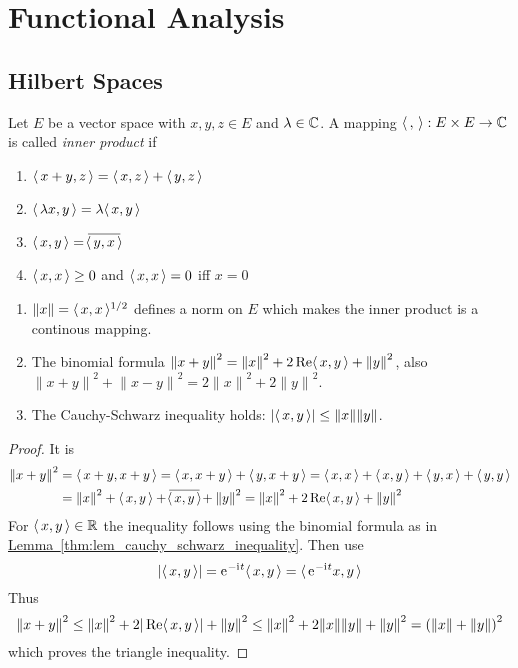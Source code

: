 \newpage
\section{Functional Analysis}

\subsection{Hilbert Spaces}
\bigskip

\begin{definition}
    Let \( E \) be a vector space with \( x, y, z \in E \) and \( \lambda \in \mathbb{C} \). A mapping
    \( \langle\,,\,\rangle: E\times E \to \mathbb{C} \) is called \emph{inner product} if
    \begin{enumerate}
        \item \( \langle\,x + y,z\,\rangle = \langle\,x,z\,\rangle + \langle\,y,z\,\rangle \)
        \item \( \langle\,\lambda x,y\,\rangle = \lambda \langle\,x,y\,\rangle\)
        \item \( \langle\,x,y\,\rangle = \overline{\!\langle\,y,x\,\rangle\!} \)
        \item \( \langle\,x,x\,\rangle \ge 0 \) and \( \langle\,x,x\,\rangle = 0 \) iff \( x = 0 \)
    \end{enumerate}
\end{definition}
\bigskip


\begin{lemma}
    \hfill
    \begin{enumerate}
        \item \( \|x\| = \langle\,x,x\,\rangle^{1/2} \) defines a norm on \( E \)
              which makes the inner product is a continous mapping.
        \item The binomial formula \( {\|x + y\|}^2 = {\|x\|}^2 + 2\operatorname{Re}\langle\,x,y\,\rangle + {\|y\|}^2 \),
              also \( {\|x + y\|}^2 + {\|x - y\|}^2 = 2{\|x\|}^2 + 2{\|y\|}^2 \).
        \item The Cauchy-Schwarz inequality holds: \( |\langle\,x,y\,\rangle| \le \|x\| \|y\| \).
    \end{enumerate}
\end{lemma}
\begin{proof}
    It is \[
        \begin{split}
            {\|x + y\|}^2 & = \langle\,x + y,x + y\,\rangle  = \langle\,x,x + y\,\rangle + \langle\,y,x + y\,\rangle
            = \langle\,x,x\,\rangle + \langle\,x,y\,\rangle + \langle\,y,x\,\rangle + \langle\,y,y\,\rangle \\
            & = {\|x\|}^2 + \langle\,x,y\,\rangle + \overline{\!\langle\,x,y\,\rangle\!} + {\|y\|}^2
            = {\|x\|}^2 + 2\operatorname{Re}\langle\,x,y\,\rangle + {\|y\|}^2
        \end{split}
    \]
    For \( \langle\,x,y\,\rangle \in \mathbb{R} \) the inequality follows using the binomial formula as in
    \hyperref[thm:lem_cauchy_schwarz_inequality]{Lemma~\ref*{thm:lem_cauchy_schwarz_inequality}}.
    Then use \[
        |\langle\,x,y\,\rangle| = \mathrm{e}\mkern1mu^{-\mathrm{i}\mkern1mu t} \langle\,x,y\,\rangle = \langle\,\mathrm{e}\mkern1mu^{-\mathrm{i}\mkern1mu t} x,y\,\rangle
    \]
    Thus \[
        {\|x + y\|}^2 \le {\|x\|}^2 + 2|\operatorname{Re}\langle\,x,y\,\rangle| + {\|y\|}^2
        \le {\|x\|}^2 +  2\|x\| \|y\| + {\|y\|}^2 = {(\|x\| + \|y\|)}^2
    \]
    which proves the triangle inequality.
\end{proof}
\bigskip


